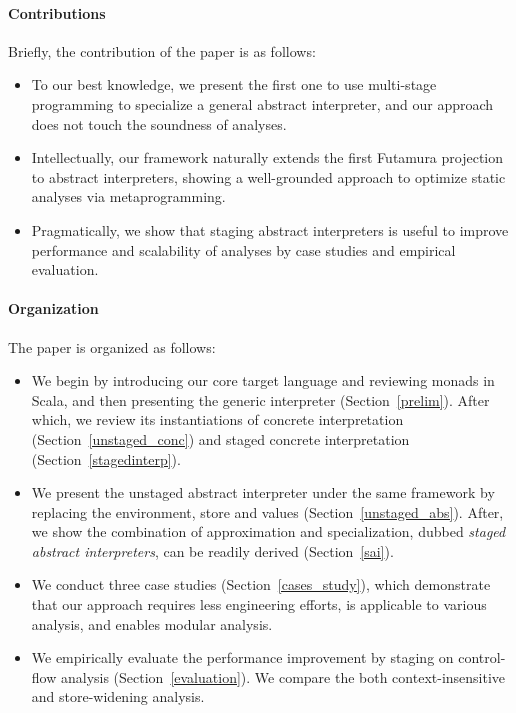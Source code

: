 \paragraph{Contributions} Briefly, the contribution of the paper is as follows:
\begin{itemize}[leftmargin=2em]
  \item To our best knowledge, we present the first one to use
    multi-stage programming to specialize a general abstract interpreter,
    and our approach does not touch the soundness of analyses.
  \item Intellectually, our framework naturally extends the first
    Futamura projection to abstract interpreters, showing a
    well-grounded approach to optimize static analyses via
    metaprogramming.
  \item Pragmatically, we show that staging abstract interpreters is
    useful to improve performance and scalability of analyses by case
    studies and empirical evaluation.
\end{itemize}

\paragraph{Organization} The paper is organized as follows:
\begin{itemize}[leftmargin=2em]
  \item We begin by introducing our core target language and reviewing
    monads in Scala, and then presenting the generic interpreter (Section~\ref{prelim}).
    After which, we review its instantiations of concrete interpretation
    (Section~\ref{unstaged_conc}) and staged concrete interpretation
    (Section~\ref{stagedinterp}).
  \item We present the unstaged abstract interpreter under the same framework by
    replacing the environment, store and values (Section~\ref{unstaged_abs}).
    After, we show the combination of approximation and specialization, dubbed
    \textit{staged abstract interpreters}, can be readily derived (Section~\ref{sai}).
  \item We conduct three case studies (Section~\ref{cases_study}), which demonstrate that
    our approach requires less engineering efforts, is applicable to various analysis,
    and enables modular analysis.
  \item We empirically evaluate the performance improvement by staging on
    control-flow analysis (Section~\ref{evaluation}). We compare the both
    context-insensitive and store-widening analysis.
\end{itemize}

\iffalse
On the other side, static analysis is a tradeoff between performance and
precision: higher precision usually leads to longer running time.

4. Existing method to improve the performance is adhoc, engineering heavy, require to rewrite the optimized version, therefore harder to reason about the correctness
6. program analyzers are also meta-programs, they manipulate other programs as data objects
\fi

